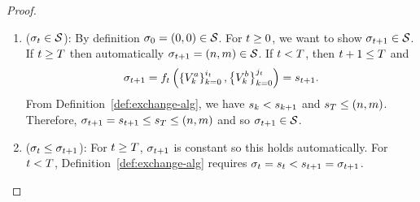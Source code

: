 \begin{proof}
    \begin{enumerate}
        
    \item
        ($\sigma_{t}\in\mathcal{S}$): 
        By definition
        \(
            \sigma_{0}=(0,0)\in\mathcal{S}
        \).
        For $t\geq 0$, we want to show
        \(
            \sigma_{t+1}\in\mathcal{S}
        \).
        If $t\geq T$ then automatically
        \(
            \sigma_{t+1}
            =
            \left(
                n,m
            \right)\in\mathcal{S}
        \).
        If $t < T$, then $t+1\leq T$ and
        \[
            \sigma_{t+1}
            =
            f_{t}\left(
                \left\{
                    V^a_{k}
                \right\}_{k=0}^{i_{t}}
                ,
                \left\{
                    V^b_{k}
                \right\}_{k=0}^{j_{t}}
            \right)
            =
            s_{t+1} .
        \]
        From Definition~\ref{def:exchange-alg}, we have
        \(
            s_{k}
            <
            s_{k+1}
        \)
        and 
        \(
            s_{T}
            \leq
            \left(
                n,m
            \right)
        \). 
        Therefore, 
        \(
            \sigma_{t+1}
            =
            s_{t+1}
            \leq
            s_{T}
            \leq
            \left(
                n,m
            \right)
        \)
        and so 
        \(
            \sigma_{t+1}
            \in\mathcal{S}
        \).

        \item
        ($\sigma_{t}\leq\sigma_{t+1}$):
        For $t\geq T$, $\sigma_{t+1}$ is constant so this
        holds automatically. For $t<T$,
        Definition~\ref{def:exchange-alg} requires
        \(
            \sigma_{t}
            =
            s_{t}
            <
            s_{t+1}
            =
            \sigma_{t+1}
        \). 
    

\end{enumerate}
\end{proof}
